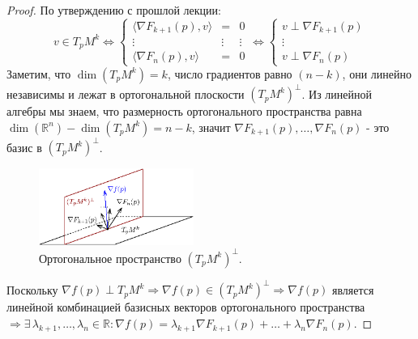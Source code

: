 \documentclass[12pt]{article}
\newcommand{\MR}{\mathbb{R}}
\theoremstyle{definition}
\begin{document}
\begin{proof}
	По утверждению с прошлой лекции: 
	$$
		v \in T_pM^k \Leftrightarrow 
		\left\{
		\begin{array}{ccc}
			\langle \nabla F_{k+1}(p),v \rangle & =& 0\\
			\vdots & \vdots & \vdots \\
			\langle \nabla F_n(p),v \rangle &=& 0
		\end{array}
		\right.
		\Leftrightarrow 
		\left\{
		\begin{array}{c}
			v \perp \nabla F_{k+1}(p)\\
			\vdots  \\
			v \perp \nabla F_n(p)
		\end{array}
		\right.
	$$
	Заметим, что $\dim{(T_pM^k)} = k$, число градиентов равно $(n-k)$, они линейно независимы и лежат в ортогональной плоскости $(T_pM^k)^{\perp}$. Из линейной алгебры мы знаем, что размерность ортогонального пространства равна $\dim{(\MR^n)} - \dim{(T_pM^k)} = n -k$, значит $\nabla F_{k+1}(p), \dotsc, \nabla F_n(p)$ - это базис в $(T_pM^k)^{\perp}$.
	\begin{figure}[H]
		\centering
		\includegraphics[width=0.45\textwidth]{20_5.eps}
		\caption{Ортогональное пространство $(T_pM^k)^{\perp}$.}
		\label{20_5}
	\end{figure}
	Поскольку $\nabla f(p) \perp T_pM^k \Rightarrow \nabla f(p) \in (T_pM^k)^{\perp} \Rightarrow \nabla f(p)$ является линейной комбинацией базисных векторов ортогонального пространства $\Rightarrow\exists \, \lambda_{k+1}, \dotsc, \lambda_n \in \MR \colon \nabla f(p) = \lambda_{k+1} \nabla F_{k+1} (p) + \dotsc + \lambda_n \nabla F_n(p)$.
\end{proof}
\end{document}
